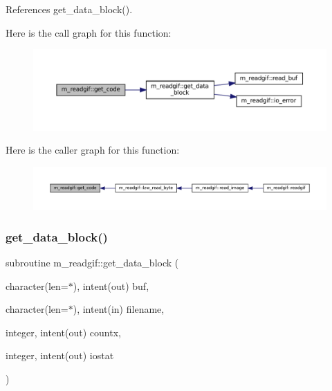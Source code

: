 References get\+\_\+data\+\_\+block().

Here is the call graph for this function\+:\nopagebreak
\begin{figure}[H]
\begin{center}
\leavevmode
\includegraphics[width=350pt]{namespacem__readgif_a027fedbf7ba68763483988c1aa6d2cea_cgraph}
\end{center}
\end{figure}
Here is the caller graph for this function\+:\nopagebreak
\begin{figure}[H]
\begin{center}
\leavevmode
\includegraphics[width=350pt]{namespacem__readgif_a027fedbf7ba68763483988c1aa6d2cea_icgraph}
\end{center}
\end{figure}
\mbox{\label{namespacem__readgif_ace6e51d0293107696bd1482348414a43}} 
\subsubsection{\texorpdfstring{get\+\_\+data\+\_\+block()}{get\_data\_block()}}
{\footnotesize\ttfamily subroutine m\+\_\+readgif\+::get\+\_\+data\+\_\+block (\begin{DoxyParamCaption}\item[{character(len=$\ast$), intent(out)}]{buf,  }\item[{character(len=$\ast$), intent(in)}]{filename,  }\item[{integer, intent(out)}]{countx,  }\item[{integer, intent(out)}]{iostat }\end{DoxyParamCaption})\hspace{0.3cm}{\ttfamily [private]}}



